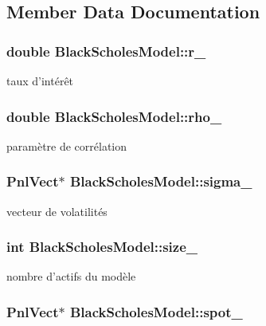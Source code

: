 \subsection{Member Data Documentation}
\hypertarget{classBlackScholesModel_a9b07eb1d8a7ada20e1a723ba19172644}{
\subsubsection[{r\-\_\-}]{\setlength{\rightskip}{0pt plus 5cm}double Black\-Scholes\-Model\-::r\-\_\-}}\label{classBlackScholesModel_a9b07eb1d8a7ada20e1a723ba19172644}
taux d'intérêt \hypertarget{classBlackScholesModel_a1022a65929e3656f8990b7b0a63705ba}{
\subsubsection[{rho\-\_\-}]{\setlength{\rightskip}{0pt plus 5cm}double Black\-Scholes\-Model\-::rho\-\_\-}}\label{classBlackScholesModel_a1022a65929e3656f8990b7b0a63705ba}
paramètre de corrélation \hypertarget{classBlackScholesModel_a745a2d85da5056b44bd88f37ee7b33e0}{
\subsubsection[{sigma\-\_\-}]{\setlength{\rightskip}{0pt plus 5cm}Pnl\-Vect$\ast$ Black\-Scholes\-Model\-::sigma\-\_\-}}\label{classBlackScholesModel_a745a2d85da5056b44bd88f37ee7b33e0}
vecteur de volatilités \hypertarget{classBlackScholesModel_ab84e9318c0c1e8a50d5e2f9a70f1256e}{
\subsubsection[{size\-\_\-}]{\setlength{\rightskip}{0pt plus 5cm}int Black\-Scholes\-Model\-::size\-\_\-}}\label{classBlackScholesModel_ab84e9318c0c1e8a50d5e2f9a70f1256e}
nombre d'actifs du modèle \hypertarget{classBlackScholesModel_a6ce6853d5f0d65c8e0f07cdedca3e26a}{
\subsubsection[{spot\-\_\-}]{\setlength{\rightskip}{0pt plus 5cm}Pnl\-Vect$\ast$ Black\-Scholes\-Model\-::spot\-\_\-}}\label{classBlackScholesModel_a6ce6853d5f0d65c8e0f07cdedca3e26a}

